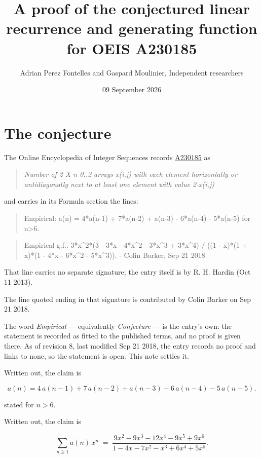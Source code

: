 \documentclass[11pt]{article}
\title{A proof of the conjectured linear recurrence and generating function for OEIS A230185}
\author{Adrian Perez Fontelles and Gaspard Moulinier, Independent researchers}
\date{09 September 2026}
\theoremstyle{definition}
\begin{document}
\maketitle
\section{The conjecture}

The Online Encyclopedia of Integer Sequences records \href{https://oeis.org/A230185}{A230185} as

\begin{quote}\itshape Number of 2 X n 0..2 arrays x(i,j) with each element horizontally or antidiagonally next to at least one element with value 2-x(i,j)\end{quote}

and carries in its Formula section the lines:

\begin{quote}\ttfamily Empirical: a(n) = 4*a(n-1) + 7*a(n-2) + a(n-3) - 6*a(n-4) - 5*a(n-5) for n>6.\end{quote}

\begin{quote}\ttfamily Empirical g.f.: 3*x\textasciicircum{}2*(3 - 3*x - 4*x\textasciicircum{}2 - 3*x\textasciicircum{}3 + 3*x\textasciicircum{}4) / ((1 - x)*(1 + x)*(1 - 4*x - 6*x\textasciicircum{}2 - 5*x\textasciicircum{}3)). - Colin Barker, Sep 21 2018\end{quote}

That line carries no separate signature; the entry itself is by R. H. Hardin (Oct 11 2013).

The line quoted ending in that signature is contributed by Colin Barker on Sep 21 2018.

The word {\itshape Empirical} --- equivalently {\itshape Conjecture} --- is the entry's own: the statement is recorded as fitted to the published terms, and no proof is given there. As of revision 8, last modified Sep 21 2018, the entry records no proof and links to none, so the statement is open. This note settles it.

Written out, the claim is

\[a(n) = 4\,a(n-1) + 7\,a(n-2) + a(n-3) - 6\,a(n-4) - 5\,a(n-5).\]

stated for $n > 6$.

Written out, the claim is

\[\sum_{n \ge 1} a(n)\,x^n \;=\; \frac{9x^{2} - 9x^{3} - 12x^{4} - 9x^{5} + 9x^{6}}{1 - 4x - 7x^{2} - x^{3} + 6x^{4} + 5x^{5}}.\]
\end{document}
